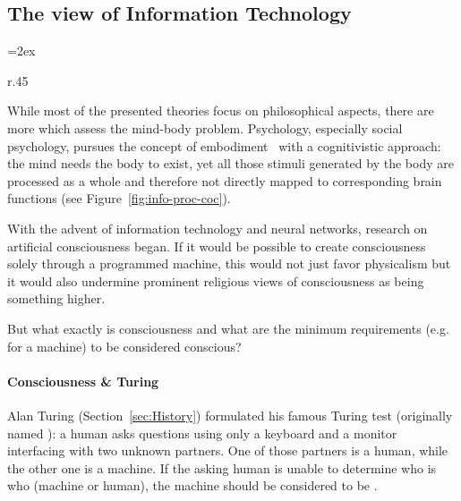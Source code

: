 

\subsection{The view of Information Technology}

{\columnsep=2ex\begin{wrapfigure}[11]{r}{.45\linewidth}
\vspace*{-.9\baselineskip}
\caption{Cognitivistic information processing.}
\label{fig:info-proc-coc}
\end{wrapfigure}
While most of the presented theories focus on philosophical aspects, there are more which assess the mind-body problem.
Psychology, especially social psychology, pursues the concept of embodiment~\cite{meier2012embodiment} with a cognitivistic approach:
the mind needs the body to exist, yet all those stimuli generated by the body are processed as a whole and therefore not directly mapped to corresponding brain functions (see Figure~\ref{fig:info-proc-coc}).\par}

With the advent of information technology and neural networks, research on artificial consciousness began. If it would be possible to create consciousness solely through a programmed machine, this would not just favor physicalism but it would also undermine prominent religious views of consciousness as being something higher.

But what exactly is consciousness and what are the minimum requirements (e.g. for a machine) to be considered conscious?

\paragraph{Consciousness \& Turing} Alan Turing (Section~\ref{sec:History}) formulated his famous Turing test (originally named ): a human asks questions using only a
keyboard and a monitor interfacing with two unknown partners. One of those partners is a human, while the other one is a machine. If the asking human is unable to determine who is who (machine or human), the machine should be considered to be .


